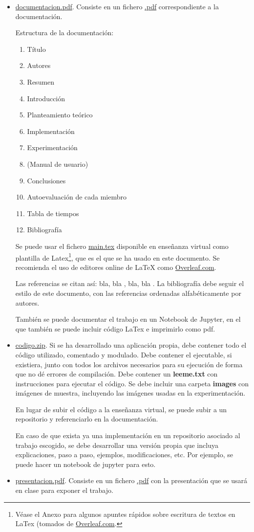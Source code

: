 \documentclass[a4paper]{article}
\begin{document}
 \begin{itemize}
\item \url{documentacion.pdf}. Consiste en un fichero \url{.pdf} correspondiente a la documentación. 

Estructura de la documentación:

\begin{enumerate}
\item[]  Título
\item[]  Autores
\item[]  Resumen
\item  Introducción 
\item  Planteamiento teórico 
\item  Implementación
\item  Experimentación
\item  (Manual de usuario)
\item  Conclusiones
\item Autoevaluación de cada miembro
\item  Tabla de tiempos
\item[]  Bibliografía
\end{enumerate}

Se puede usar el fichero \url{main.tex} disponible en enseñanza virtual como plantilla de Latex\footnote{Véase el Anexo para algunos apuntes rápidos sobre escritura de textos en LaTex (tomados de \url{Overleaf.com}.}, que es el que se ha usado en este documento. Se recomienda el uso de editores online de LaTeX como \url{Overleaf.com}.

Las referencias se citan así:
bla, bla \cite{clave:revista}, bla, bla \cite{clave:libro}. La bibliografía
debe seguir el estilo de este documento, con las referencias ordenadas alfabéticamente por autores.

También se puede documentar el trabajo en un Notebook de Jupyter, en el que también se puede incluir código LaTex e imprimirlo como pdf.

\item \url{codigo.zip}. Si se ha desarrollado una aplicación propia, debe contener todo el código utilizado, comentado y modulado. Debe contener el ejecutable, si existiera, junto con todos los archivos necesarios para su ejecución de forma que no dé errores de compilación.
Debe contener un {\bf leeme.txt} con instrucciones para ejecutar el código.
Se debe incluir una carpeta \textbf{images} con imágenes de muestra, incluyendo las imágenes usadas en la experimentación.

En lugar de subir el código a la enseñanza virtual, se puede subir a un repositorio y referenciarlo en la documentación. 

En caso de que exista ya una implementación en un repositorio asociado al trabajo escogido, se debe desarrollar una versión propia que incluya explicaciones, paso a paso, ejemplos, modificaciones, etc. Por ejemplo, se puede hacer un notebook de jupyter para esto.



\item \url{presentacion.pdf}. Consiste en un fichero \url{.pdf} con la presentación que se usará en clase para exponer el trabajo.
\end{itemize}
\end{document}
